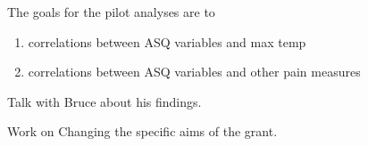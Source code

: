 \documentclass{article}
\begin{document}


The goals for the pilot analyses are to
\begin{enumerate}
\item correlations between ASQ variables and max temp
\item correlations between ASQ variables and other pain measures
\end{enumerate}


Talk with Bruce about his findings.

Work on Changing the specific aims of the grant.
\end{document}
